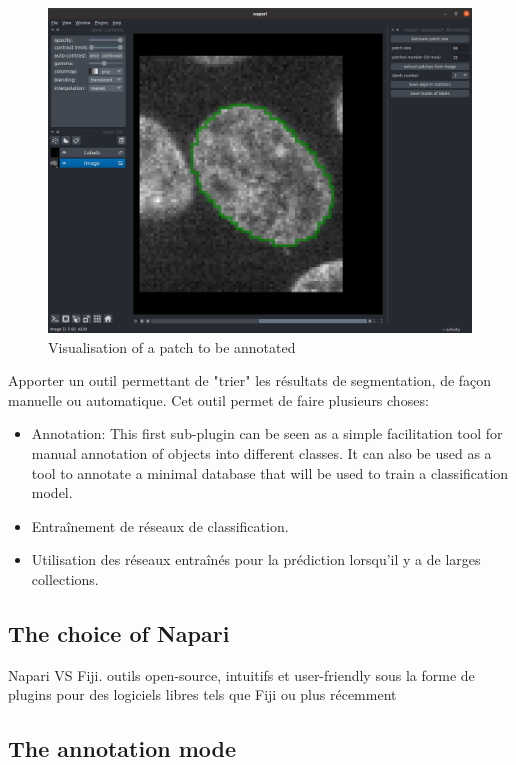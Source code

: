 \documentclass{article}
\begin{document}
\begin{figure}[htp!]
 \centering
 \includegraphics[scale=0.2]{Figures/patch.png}
  \caption{Visualisation of a patch to be annotated}
  \label{patch}

\end{figure}

Apporter un outil permettant de "trier" les résultats de segmentation, de façon manuelle ou automatique. 
Cet outil permet de faire plusieurs choses:
\begin{itemize}
  \item Annotation: This first sub-plugin can be seen as a simple facilitation tool for manual annotation of objects into different classes. It can also be used as a tool to annotate a minimal database that will be used to train a classification model. 
  \item Entraînement de réseaux de classification. 
  \item Utilisation des réseaux entraînés pour la prédiction lorsqu'il y a de larges collections.
\end{itemize}


\subsection{The choice of Napari}

Napari VS Fiji.
outils open-source, intuitifs et user-friendly sous la forme de plugins pour des logiciels libres tels que Fiji \cite{schindelin2012fiji} ou plus récemment 


\subsection{The annotation mode}
\end{document}

